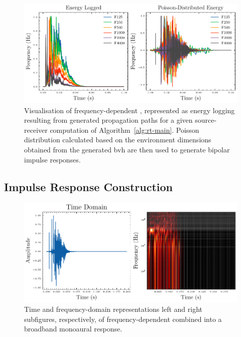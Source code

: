 \begin{figure}[htbp]
    \centering
    \includegraphics[width=1\linewidth]{rir-processing}
    \caption[Ray tracing-based frequency-dependent Impulse Response generation]{Visualisation of frequency-dependent , represented as energy logging resulting from generated propagation paths for a given source-receiver computation of Algorithm~\ref{alg:rt-main}. Poisson distribution calculated based on the environment dimensions obtained from the generated \acrshort{bvh} are then used to generate bipolar impulse responses.}\label{fig:rir-freqdep-poisson}
\end{figure}

\subsection{Impulse Response Construction}
\begin{figure}[htbp]
    \centering
    \includegraphics[width=1\linewidth]{rir-rt-final}
    \caption[Ray tracing-based monoaural Impulse Response generation]{Time and frequency-domain representations left and right subfigures, respectively, of frequency-dependent  combined into a broadband monoaural response. }
    \label{fig:rir-freqdep-monoaural}
\end{figure}

